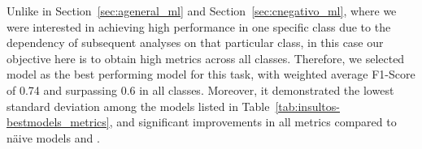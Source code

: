 \begin{table}[H]
    \centering
    \begingroup
    \small %
    \endgroup
\end{table}


Unlike in Section~\ref{sec:ageneral_ml} and Section~\ref{sec:cnegativo_ml}, where we were interested in achieving high performance in one specific class due to the dependency of subsequent analyses on that particular class, in this case our objective here is to obtain high metrics across all classes. Therefore, we selected model \textbf{\insmlptea} as the best performing model for this task, with weighted average F1-Score of 0.74 and surpassing 0.6 in all classes. Moreover, it demonstrated the lowest standard deviation among the models listed in Table~\ref{tab:insultos-bestmodels_metrics}, and significant improvements in all metrics compared to näive models {\insmajor} and {\insrandom}.

